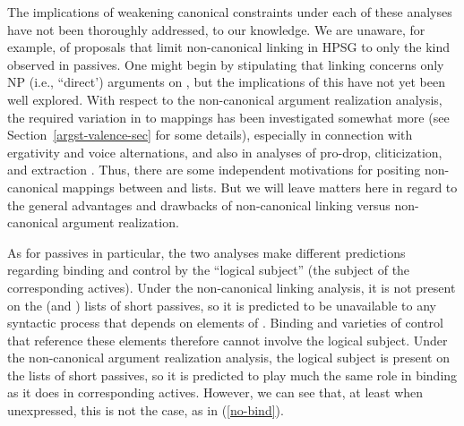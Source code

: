 \documentclass[output=paper
 	        ,biblatex
                ,babelshorthands
                ,newtxmath
                ,draftmode
                ,colorlinks, citecolor=brown
]{langscibook}
\begin{document}
The implications of weakening canonical constraints under each of these analyses have not been thoroughly addressed, to our knowledge.
We are unaware, for example, of proposals that limit non-canonical linking in HPSG to only the kind observed in passives.
One might begin by stipulating that linking concerns only NP (i.e., ``direct') arguments on \argst, but the implications of this have not yet been well explored.
With respect to the non-canonical argument realization analysis, the required variation in \argst to  mappings has been investigated somewhat more (see Section~\ref{argst-valence-sec} for some details), especially in connection with ergativity and voice alternations, and also in analyses of pro-drop, cliticization, and extraction \citep{MillerandSag1997, Manning+Sag:1999, Boumaetal2001}.
Thus, there are some independent motivations for positing non-canonical mappings between \argst and  lists.
But we will leave matters here in regard to the general advantages and drawbacks of non-canonical linking versus non-canonical argument realization.

As for passives in particular, the two analyses make different predictions regarding binding and control by the ``logical subject'' (the subject of the corresponding actives).
Under the non-canonical linking analysis, it is not present on the \argst (and ) lists of short passives, so it is predicted to be unavailable to any syntactic process that depends on elements of \argst.
Binding and varieties of control that reference these elements therefore cannot involve the logical subject.
Under the non-canonical argument realization analysis, the logical subject is present on the \argst lists of short passives, so it is predicted to play much the same role in binding as it does in corresponding actives.
However, we can see that, at least when unexpressed, this is not the case, as in (\ref{no-bind}).
\begin{exe}
\end{exe}
\end{document}
